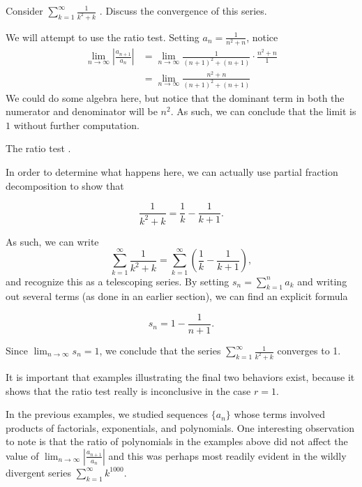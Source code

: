 \documentclass{ximera}
\begin{document}
\begin{example}
  Consider $\sum_{k=1}^\infty \frac{1}{k^2+k}$ .  Discuss the convergence of this series.
  \begin{explanation}
    We will attempt to use the ratio test. Setting $a_n =
    \frac{1}{n^2+n}$, notice 
\begin{align*}
     \lim_{n \to \infty} \left|\frac{a_{n+1}}{a_n}\right| &= \lim_{n \to \infty} \frac{1}{(n+1)^2+(n+1)} \cdot  \frac{n^2+n}{1} \\
     &= \lim_{n \to \infty} \frac{n^2+n}{(n+1)^2+(n+1)}
\end{align*}
We could do some algebra here, but notice that the dominant term in both the numerator and denominator will be $n^2$.  As such, we can conclude that the limit is $1$ without further computation.

The ratio test 
    .		
  
In order to determine what happens here, we can actually use partial fraction decomposition to show that 

\[
\frac{1}{k^2+k} = \frac{1}{k}-\frac{1}{k+1}.
\] 

As such, we can write \[\sum_{k=1}^{\infty} \frac{1}{k^2+k} = \sum_{k=1}^{\infty} \left(\frac{1}{k}-\frac{1}{k+1}\right),\] and recognize this as a telescoping series.  By setting $s_n = \sum_{k=1}^na_k$ and writing out several terms (as done in an earlier section), we can find an explicit formula

\[
s_n = 1 - \frac{1}{n+1}.
\]

Since $\lim_{n \to \infty} s_n = 1$, we conclude that the series $\sum_{k=1}^{\infty} \frac{1}{k^2+k}$ converges to 1.
\end{explanation}
\end{example}

\begin{remark}
It is important that examples illustrating the final two behaviors
exist, because it shows that the ratio test really is inconclusive in
the case $r=1$.
\end{remark}

In the previous examples, we studied sequences $\{a_n\}$ whose terms involved products of factorials, exponentials, and polynomials.  One interesting observation to note is that the ratio of polynomials in the examples above did not affect the value of $\lim_{n \to \infty} \left|\frac{a_{n+1}}{a_n}\right|$ and this was perhaps most readily evident in the wildly divergent series $\sum_{k=1}^{\infty} k^{1000}$.
\end{document}
